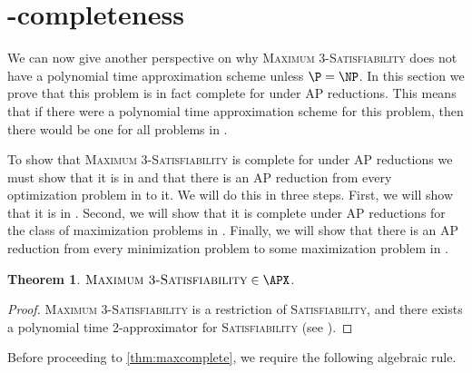 \documentclass[]{article}
\theoremstyle{plain}
\newtheorem{theorem}{Theorem}
\theoremstyle{definition}
\begin{document}
\section{\texorpdfstring{\APX}{APX}-completeness}\label{sec:complete}

We can now give another perspective on why \textsc{Maximum 3-Satisfiability} does not have a polynomial time approximation scheme unless $\P = \NP$.
In this section we prove that this problem is in fact complete for \APX{} under AP reductions.
This means that if there were a polynomial time approximation scheme for this problem, then there would be one for all problems in \APX.

To show that \textsc{Maximum 3-Satisfiability} is complete for \APX{} under AP reductions we must show that it is in \APX{} and that there is an AP reduction from every optimization problem in \APX{} to it.
We will do this in three steps.
First, we will show that it is in \APX.
Second, we will show that it is complete under AP reductions for the class of maximization problems in \APX.
Finally, we will show that there is an AP reduction from every minimization problem to some maximization problem in \APX.

\begin{theorem}\label{thm:inapx}
  $\textsc{Maximum 3-Satisfiability} \in \APX$.
\end{theorem}
\begin{proof}
  \textsc{Maximum 3-Satisfiability} is a restriction of \textsc{Satisfiability}, and there exists a polynomial time 2-approximator for \textsc{Satisfiability} (see \cite[Program~3.1]{book}).
\end{proof}

Before proceeding to \autoref{thm:maxcomplete}, we require the following algebraic rule.
\end{document}
